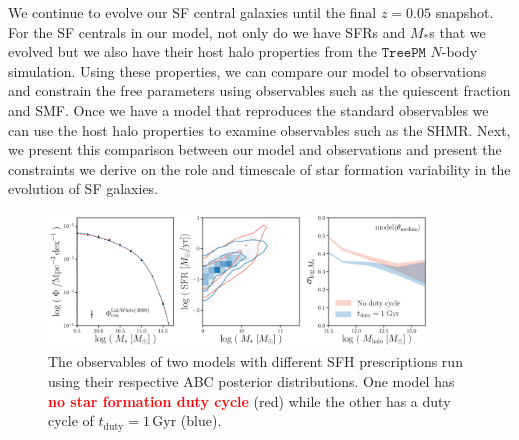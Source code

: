 \documentclass[12pt, letterpaper, preprint]{aastex}
\newcommand{\todo}[1]{{\bf \textcolor{red}{#1}}}
\begin{document}
We continue to evolve our SF central galaxies until the final $z = 0.05$ 
snapshot. For the SF centrals in our model, not only do we have SFRs and 
$M_*$s that we evolved but we also have their host halo properties from the 
$\mathtt{TreePM}$ $N$-body simulation. Using these properties, we can compare 
our model to observations and constrain the free parameters using observables 
such as the quiescent fraction and SMF. Once we have a model that reproduces 
the standard observables we can use the host halo properties to examine 
observables such as the SHMR. Next, we present this comparison between 
our model and observations and present the constraints we derive on the role 
and timescale of star formation variability in the evolution of SF galaxies.

\begin{figure}
\begin{center}
\includegraphics[width=0.9\textwidth]{figs/qaplot_abc.pdf}
\caption{The observables of two models with different SFH prescriptions run 
    using their respective ABC posterior distributions. One model has \todo{no star formation duty cycle} (red) 
    while the other has a duty cycle of $t_\mathrm{duty} = 1\,\mathrm{Gyr}$ (blue). 
    }
\label{fig:abc_demo}
\end{center}
\end{figure}
\end{document}
